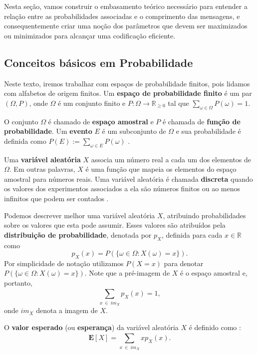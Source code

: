 Nesta seção, vamos construir o embasamento teórico necessário para entender a relação entre as probabilidades associadas e o comprimento das mensagens, e consequentemente criar uma noção dos parâmetros que devem ser maximizados ou minimizados para alcançar uma codificação eficiente.

\subsection{Conceitos básicos em Probabilidade}
Neste texto, iremos trabalhar com espaços de probabilidade finitos,
pois lidamos com alfabetos de origem finitos. Um \textbf{espaço de
  probabilidade finito} é um par $(\Omega, P)$, onde $\Omega$ é um
conjunto finito e $P\colon \Omega \to \mathbb{R}_{\geq 0}$ tal que
$\sum_{\omega \in \Omega} P(\omega) = 1$.

O conjunto $\Omega$ é chamado de \textbf{espaço amostral} e $P$ é
chamada de \textbf{função de probabilidade}. Um \textbf{evento} $E$ é
um subconjunto de $\Omega$ e sua probabilidade é definida como $P(E)
:= \sum_{\omega \in E} P(\omega)$ \cite{BT}.

Uma \textbf{variável aleatória} $X$ associa um número real a cada
um dos elementos de $\Omega$. Em outras palavras, $X$ é uma
função que mapeia os elementos do espaço amostral para números
reais. Uma variável aleatória é chamada \textbf{discreta} quando os
valores dos experimentos associados a ela são números finitos ou ao
menos infinitos que podem ser contados \cite{BT}.

Podemos descrever melhor uma variável aleatória $X$, atribuindo
probabilidades sobre os valores que esta pode assumir. Esses valores
são atribuídos pela \textbf{distribuição de probabilidade}, denotada
por $p_X$, definida para cada $x\in\mathbb{R}$ como
\begin{equation} \label{eq:dist_prob_def}
p_X(x) = P(\{\omega\in \Omega: X(\omega) = x\}).
\end{equation}
Por simplicidade de notação utilizamos $P(X=x)$ para denotar
$P(\{\omega\in \Omega: X(\omega) = x\})$. Note que a pré-imagem de $X$
é o espaço amostral e, portanto,
\begin{equation} \label{eq:dist_prob_sum}
\sum_{x ~\in ~im_X}^{}p_X(x) = 1,
\end{equation}
onde $im_X$ denota a imagem de $X$.

O \textbf{valor esperado} (ou \textbf{esperança}) da variável aleatória $X$ é definido como \cite{BT}:
\begin{equation} \label{eq:exp_val}
\textbf{E}[X] = \sum_{x ~\in ~im_X}^{} xp_X(x).
\end{equation}
